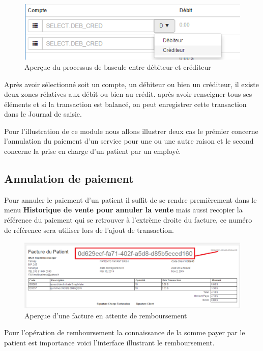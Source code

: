 \documentclass[12pt,a4paper]{report}
\begin{document}
\begin{figure}[h]
\begin{center}
\includegraphics[width=12cm]{pic/SelectCredit.png}
\end{center}
\caption{Aperçue du processus de bascule entre débiteur et créditeur}
\label{Aperçue du processus de bascule entre débiteur et créditeur}
\end{figure}

Après avoir sélectionné soit un compte, un débiteur ou bien un créditeur, il existe deux zones rélatives aux débit ou bien au crédit. après avoir renseigner tous ses éléments et si la transaction est balancé, on peut enregistrer cette transaction dans le Journal de saisie.

Pour l'illustration de ce module nous allons illustrer deux cas le prémier concerne l'annulation du paiement d'un service pour une ou une autre raison et le second concerne la prise en charge d'un patient par un employé.

\subsection{Annulation de paiement}
Pour annuler le paiement d'un patient il suffit de se rendre premièrement dans le menu \textbf{Historique de vente pour annuler la vente} mais aussi recopier la référence du paiement qui se retrouver à l'extrème droite du facture, ce numéro de référence sera utiliser lors de l'ajout de transaction.

\begin{figure}[h]
\begin{center}
\includegraphics[width=12cm]{pic/RefDocument.png}
\end{center}
\caption{Aperçue d'une facture en attente de remboursement}
\label{Aperçue d'une facture en attente de remboursement}
\end{figure}
\newpage
Pour l'opération de remboursement la connaissance de la somme payer par le patient est importance voici l'interface illustrant le remboursement.
\end{document}
